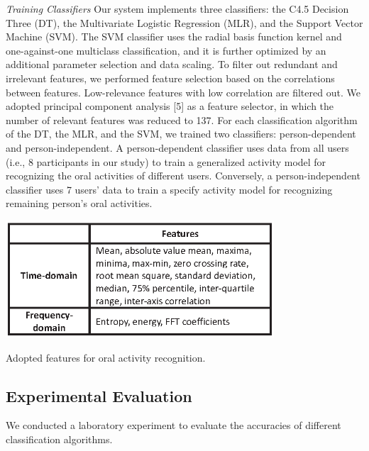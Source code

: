\textit{Training Classifiers}
\newline
Our system implements three classifiers: the C4.5 Decision Three (DT), the Multivariate Logistic Regression (MLR), and the Support Vector Machine (SVM). The SVM classifier uses the radial basis function kernel and one-against-one multiclass classification, and it is further optimized by an additional parameter selection and data scaling. To filter out redundant and irrelevant features, we performed feature selection based on the correlations between features. Low-relevance features with low correlation are filtered out. We adopted principal component analysis [5] as a feature selector, in which the number of relevant features was reduced to 137. 
For each classification algorithm of the DT, the MLR, and the SVM, we trained two classifiers: person-dependent and person-independent. A person-dependent classifier uses data from all users (i.e., 8 participants in our study) to train a generalized activity model for recognizing the oral activities of different users. Conversely, a person-independent classifier uses 7 users' data to train a specify activity model for recognizing remaining person's oral activities.

\begin{table}[!ht]
\centering
\includegraphics[width=10cm]{image/teeth_table1}
\caption{Adopted features for oral activity recognition.}
\label{teeth_features}
\end{table}

\subsection{Experimental Evaluation}
We conducted a laboratory experiment to evaluate the accuracies of different classification algorithms.

